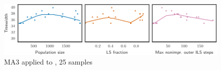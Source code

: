 \begin{figure}[h]\strictpagecheck\centering

\includegraphics[scale=0.85]{plots/MA3-correlation-regplots-inithx-i-3-0-crop.pdf}


\caption[Parameter influence for MA3 when applied to ]{\gls{MA3} applied to , 25 samples}

\label{MA3-correlation-regplots-inithx-i-3}

\end{figure}